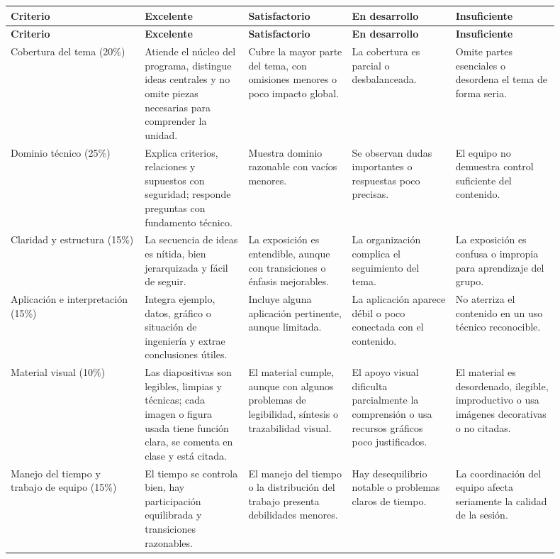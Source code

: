 \documentclass[11pt]{article}
\begin{document}
\small
{\setlength{\tabcolsep}{4pt}
\begin{longtable}{@{}p{0.22\linewidth} p{0.17\linewidth} p{0.17\linewidth} p{0.17\linewidth} p{0.17\linewidth}@{}}
\toprule
\textbf{Criterio} & \textbf{Excelente} & \textbf{Satisfactorio} & \textbf{En desarrollo} & \textbf{Insuficiente} \\
\midrule
\endfirsthead
\toprule
\textbf{Criterio} & \textbf{Excelente} & \textbf{Satisfactorio} & \textbf{En desarrollo} & \textbf{Insuficiente} \\
\midrule
\endhead
Cobertura del tema (20\%) & Atiende el núcleo del programa, distingue ideas centrales y no omite piezas necesarias para comprender la unidad. & Cubre la mayor parte del tema, con omisiones menores o poco impacto global. & La cobertura es parcial o desbalanceada. & Omite partes esenciales o desordena el tema de forma seria. \\
Dominio técnico (25\%) & Explica criterios, relaciones y supuestos con seguridad; responde preguntas con fundamento técnico. & Muestra dominio razonable con vacíos menores. & Se observan dudas importantes o respuestas poco precisas. & El equipo no demuestra control suficiente del contenido. \\
Claridad y estructura (15\%) & La secuencia de ideas es nítida, bien jerarquizada y fácil de seguir. & La exposición es entendible, aunque con transiciones o énfasis mejorables. & La organización complica el seguimiento del tema. & La exposición es confusa o impropia para aprendizaje del grupo. \\
Aplicación e interpretación (15\%) & Integra ejemplo, datos, gráfico o situación de ingeniería y extrae conclusiones útiles. & Incluye alguna aplicación pertinente, aunque limitada. & La aplicación aparece débil o poco conectada con el contenido. & No aterriza el contenido en un uso técnico reconocible. \\
Material visual (10\%) & Las diapositivas son legibles, limpias y técnicas; cada imagen o figura usada tiene función clara, se comenta en clase y está citada. & El material cumple, aunque con algunos problemas de legibilidad, síntesis o trazabilidad visual. & El apoyo visual dificulta parcialmente la comprensión o usa recursos gráficos poco justificados. & El material es desordenado, ilegible, improductivo o usa imágenes decorativas o no citadas. \\
Manejo del tiempo y trabajo de equipo (15\%) & El tiempo se controla bien, hay participación equilibrada y transiciones razonables. & El manejo del tiempo o la distribución del trabajo presenta debilidades menores. & Hay desequilibrio notable o problemas claros de tiempo. & La coordinación del equipo afecta seriamente la calidad de la sesión. \\
\bottomrule
\end{longtable}
}
\normalsize
\end{document}

